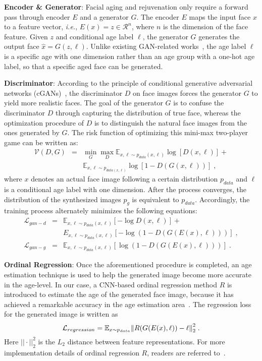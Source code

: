 \documentclass{article}
\begin{document}
{\bf\noindent Encoder \& Generator}:
Facial aging and rejuvenation only require a forward pass through encoder $E$ and a generator $G$. The encoder $E$ maps the input face $x$ to a feature vector, {\it i.e.}, $E(x) = z\in\mathcal{R}^n$, where $n$ is the dimension of the face feature. Given $z$ and conditional age label $\ell$, the generator $G$ generates the output face $\hat x = G(z, \ell)$. Unlike existing GAN-related works~\cite{zhang2017age,yang2017learning}, the age label $\ell$ is a specific age with one dimension rather than an age group with a one-hot age label, so that a specific aged face can be generated. 


{\bf\noindent Discriminator}:
According to the principle of conditional generative adversarial networks (cGANs)~\cite{mirza2014conditional}, the discriminator $D$ on face images forces the generator $G$ to yield more realistic faces. The goal of the generator $G$ is to confuse the discriminator $D$ through capturing the distribution of true face, whereas the optimization procedure of $D$ is to distinguish the natural face images from the ones generated by $G$. The risk function of optimizing this mini-max two-player game can be written as:
\begin{eqnarray}
\mathcal{V}(D, G) &=& \min_G\max_D\mathbb{E}_{x,\ell\sim p_{data}(x, \ell)}\log[D(x, \ell)] +\\ 
                  && \mathbb{E}_{x,\ell\sim p_{data(x,\ell)}}\log[1 - D(G(x, \ell))]\;,\nonumber
\label{eq_gan}
\end{eqnarray}
where $x$ denotes an actual face image following a certain distribution $p_{data}$ and $\ell$ is a conditional age label with one dimension. After the process converges, the distribution of the synthesized images $p_g$ is equivalent to $p_{data}$. Accordingly, the training process alternately minimizes the following equations:
\begin{eqnarray}
\mathcal{L}_{gan-d} &=& \mathbb{E}_{x,\ell\sim p_{data}(x, \ell)}[-\log D(x, \ell)] + \\
&&E_{x, \ell\sim p_{data}(x, \ell)}[-\log(1 - D(G(E(x), \ell)))]\;,\nonumber \\
\mathcal{L}_{gan-g} &=& \mathbb{E}_{x, \ell\sim p_{data}(x, \ell)}[\log(1 - D(G(E(x), \ell)))]\;.
\end{eqnarray}

{\bf\noindent Ordinal Regression}:
Once the aforementioned procedure is completed, an age estimation technique is used to help the generated image become more accurate in the age-level. In our case, a CNN-based ordinal regression method $R$ is introduced to estimate the age of the generated face image, because it has achieved a remarkable accuracy in the age estimation area~\cite{niu2016ordinal}. The regression loss for the generated image is written as 
\begin{equation}
\mathcal{L}_{regression} = \mathbb{E}_{x\sim p_{data}}{\Arrowvert R(G(E(x), \ell)) - \ell\Arrowvert}_2^2\;.
\end{equation}
Here $||\cdot||_2^2$ is the $L_2$ distance between feature representations. For more implementation details of ordinal regression $R$, readers are referred to~\cite{niu2016ordinal}.
\end{document}
